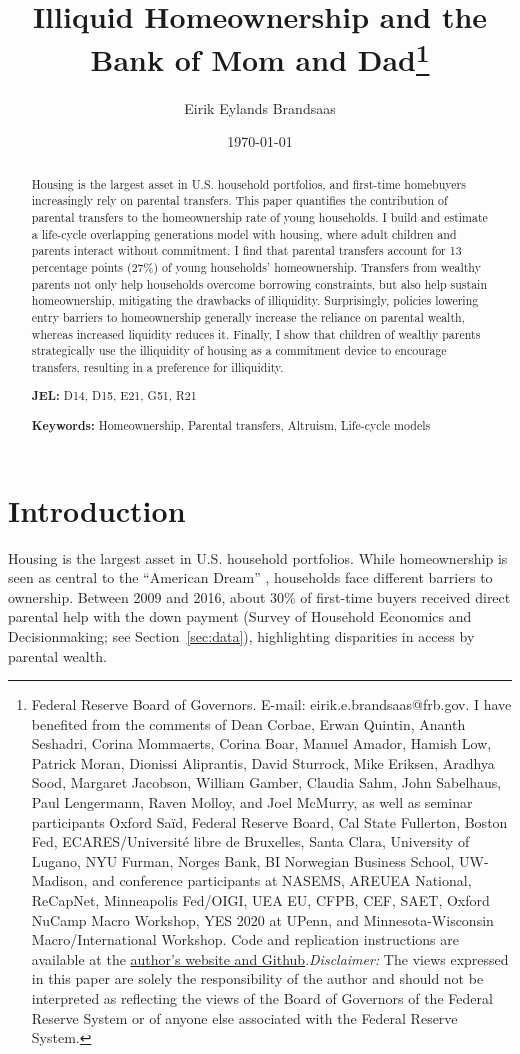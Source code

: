 \documentclass[12pt]{article}
\title{{\LARGE Illiquid Homeownership and the \\ Bank of Mom and Dad}\thanks{Federal Reserve Board of Governors. E-mail: eirik.e.brandsaas@frb.gov. I have benefited from the comments of Dean Corbae, Erwan Quintin, Ananth Seshadri, Corina Mommaerts, Corina Boar, Manuel Amador, Hamish Low, Patrick Moran, Dionissi Aliprantis, David Sturrock, Mike Eriksen, Aradhya Sood, Margaret Jacobson, William Gamber, Claudia Sahm, John Sabelhaus, Paul Lengermann, Raven Molloy, and Joel McMurry, as well as seminar participants Oxford Sa{\"i}d, Federal Reserve Board, Cal State Fullerton, Boston Fed, ECARES/Université libre de Bruxelles, Santa Clara, University of Lugano, NYU Furman, Norges Bank, BI Norwegian Business School, UW-Madison, and conference participants at NASEMS, AREUEA National, ReCapNet, Minneapolis Fed/OIGI, UEA EU, CFPB, CEF, SAET, Oxford NuCamp Macro Workshop, YES 2020 at UPenn, and Minnesota-Wisconsin Macro/International Workshop. Code and replication instructions are available at the \href{https://github.com/eirikbrandsaas/HomeownershipBankMomDad.jl}{author's  website and Github}.\newline \textit{Disclaimer: }The views expressed in this paper are solely the responsibility of the author and should not be interpreted as reflecting the views of the Board of Governors of the Federal Reserve System or of anyone else associated with the Federal Reserve System.}}
\author{Eirik Eylands Brandsaas}
\date{{\today }}
\begin{document}
\maketitle
\begin{abstract}
{\begin{spacing}{1.2}	
Housing is the largest asset in U.S. household portfolios, and first-time homebuyers increasingly rely on parental transfers. This paper quantifies the contribution of parental transfers to the homeownership rate of young households. I build and estimate a life-cycle overlapping generations model with housing, where adult children and parents interact without commitment. I find that parental transfers account for 13 percentage points (27\%) of young households' homeownership. Transfers from wealthy parents not only help households overcome borrowing constraints, but also help sustain homeownership, mitigating the drawbacks of illiquidity. Surprisingly, policies lowering entry barriers to homeownership generally increase the reliance on parental wealth, whereas increased liquidity reduces it. Finally, I show that children of wealthy parents strategically use the illiquidity of housing as a commitment device to encourage transfers, resulting in a preference for illiquidity.

\end{spacing}}
\vspace{0.5cm}
\noindent \textbf{JEL:} D14, D15, E21, G51, R21

\noindent \textbf{Keywords:} Homeownership, Parental transfers, Altruism, Life-cycle models

\end{abstract}
\newpage
\onehalfspacing

\section{Introduction}
Housing is the largest asset in U.S. household portfolios. While homeownership is seen as central to the ``American Dream'' \citep{goodman2018homeownership}, households face different barriers to ownership. Between 2009 and 2016, about 30\% of first-time buyers received direct parental help with the down payment (Survey of Household Economics and Decisionmaking; see Section~\ref{sec:data}), highlighting disparities in access by parental wealth.
\end{document}
